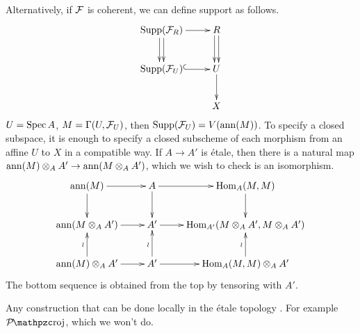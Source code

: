  \begin{remark}
   Alternatively, if $\mathcal{F}$ is coherent, we can define support as follows.
   \[\xymatrix{
      \supp(\F_R) \ar[r] \ar@<.5ex>[d]\ar@<-.5ex>[d] & R \ar@<.5ex>[d]\ar@<-.5ex>[d]\\
      \supp(\F_U) \ar@{^(->}[r] & U\ar[d]\\
      & X
   }\]
    $U=\operatorname{Spec} A$, $M=\Gamma(U,\mathcal{F}_U)$, then $\operatorname{Supp}(\mathcal{F}_U) = V(\operatorname{ann}(M))$. To specify a
   closed subspace, it is enough to specify a closed subscheme of each morphism from an
   affine $U$ to $X$ in a compatible way. 
   If $A\to A'$ is \'etale, then there is a natural map $\operatorname{ann}(M)\otimes_A A'\to
   \operatorname{ann}(M\otimes_A A')$, which we wish to check is an isomorphism.
   \[\xymatrix{
      \ann(M) \ar[r]\ar[d] & A \ar[r]\ar[d] & \hom_A(M,M)\ar[d]\\
      \ann(M\otimes_A A') \ar[r] & A'\ar[r] & \hom_{A'}(M\otimes_A A',M\otimes_A A')\\
      \ann(M)\otimes_A A' \ar[r]\ar[u]^\wr & A' \ar[r]\ar[u]^\wr & \hom_A(M,M)\otimes_A A'\ar[u]^\wr\\
   }\]
   The bottom sequence is obtained from the top by tensoring with $A'$.
 \end{remark}

 Any construction that can be done locally in the \'etale topology . For
 example $\Proj$, which we won't do.
